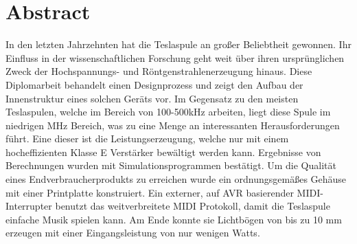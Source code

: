 \vspace{3cm}

\begingroup
\let\clearpage\relax
\chapter*{Abstract}
\endgroup

In den letzten Jahrzehnten hat die Teslaspule an großer Beliebtheit gewonnen. Ihr Einfluss in der wissenschaftlichen Forschung geht weit über ihren ursprünglichen Zweck der Hochspannungs- und Röntgenstrahlenerzeugung hinaus. Diese Diplomarbeit behandelt einen Designprozess und zeigt den Aufbau der Innenstruktur eines solchen Geräts vor. Im Gegensatz zu den meisten Teslaspulen, welche im Bereich von 100-500kHz arbeiten, liegt diese Spule im niedrigen MHz Bereich, was zu eine Menge an interessanten Herausforderungen führt. Eine dieser ist die Leistungserzeugung, welche nur mit einem hocheffizienten Klasse E Verstärker bewältigt werden kann. Ergebnisse von Berechnungen wurden mit Simulationsprogrammen bestätigt. Um die Qualität eines Endverbraucherprodukts zu erreichen wurde ein ordnungsgemäßes Gehäuse mit einer Printplatte konstruiert. Ein externer, auf AVR basierender MIDI-Interrupter benutzt das weitverbreitete MIDI Protokoll, damit die Teslaspule einfache Musik spielen kann. Am Ende konnte sie Lichtbögen von bis zu 10 mm erzeugen mit einer Eingangsleistung von nur wenigen Watts.